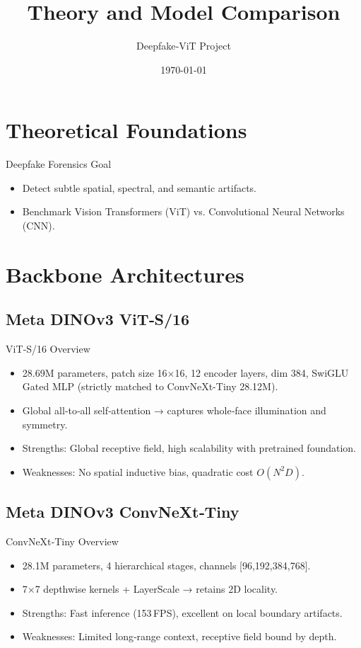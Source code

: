 \documentclass{beamer}
\title{Theory and Model Comparison}
\author{Deepfake‑ViT Project}
\date{\today}
\begin{document}
\frame{\titlepage}

\section{Theoretical Foundations}
\begin{frame}{Deepfake Forensics Goal}
  \begin{itemize}
    \item Detect subtle spatial, spectral, and semantic artifacts.
    \item Benchmark Vision Transformers (ViT) vs. Convolutional Neural Networks (CNN).
  \end{itemize}
\end{frame}

\section{Backbone Architectures}
\subsection{Meta DINOv3 ViT‑S/16}
\begin{frame}{ViT‑S/16 Overview}
  \begin{itemize}
    \item 28.69M parameters, patch size 16×16, 12 encoder layers, dim 384, SwiGLU Gated MLP (strictly matched to ConvNeXt-Tiny 28.12M).
    \item Global all‑to‑all self‑attention → captures whole‑face illumination and symmetry.
    \item Strengths: Global receptive field, high scalability with pretrained foundation.
    \item Weaknesses: No spatial inductive bias, quadratic cost $O(N^2 D)$.
  \end{itemize}
\end{frame}

\subsection{Meta DINOv3 ConvNeXt‑Tiny}
\begin{frame}{ConvNeXt‑Tiny Overview}
  \begin{itemize}
    \item 28.1M parameters, 4 hierarchical stages, channels [96,192,384,768].
    \item 7×7 depthwise kernels + LayerScale → retains 2D locality.
    \item Strengths: Fast inference (153 FPS), excellent on local boundary artifacts.
    \item Weaknesses: Limited long‑range context, receptive field bound by depth.
  \end{itemize}
\end{frame}
\end{document}
